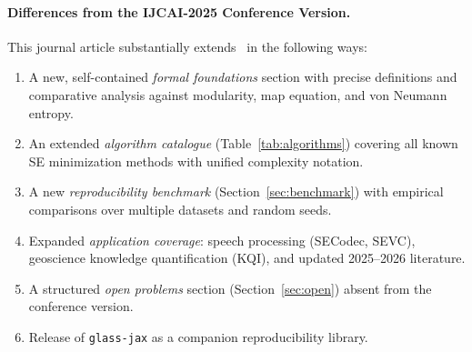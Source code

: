 \paragraph{Differences from the IJCAI-2025 Conference Version.}
This journal article substantially extends~\cite{su2025ijcai} in the following
ways:
\begin{enumerate}
  \item A new, self-contained \emph{formal foundations} section with precise
        definitions and comparative analysis against modularity, map equation,
        and von Neumann entropy.
  \item An extended \emph{algorithm catalogue} (Table~\ref{tab:algorithms})
        covering all known SE minimization methods with unified complexity
        notation.
  \item A new \emph{reproducibility benchmark} (Section~\ref{sec:benchmark})
        with empirical comparisons over multiple datasets and random seeds.
  \item Expanded \emph{application coverage}: speech processing (SECodec,
        SEVC), geoscience knowledge quantification (KQI), and updated
        2025--2026 literature.
  \item A structured \emph{open problems} section
        (Section~\ref{sec:open}) absent from the conference version.
  \item Release of \texttt{glass-jax} as a companion reproducibility library.
\end{enumerate}

